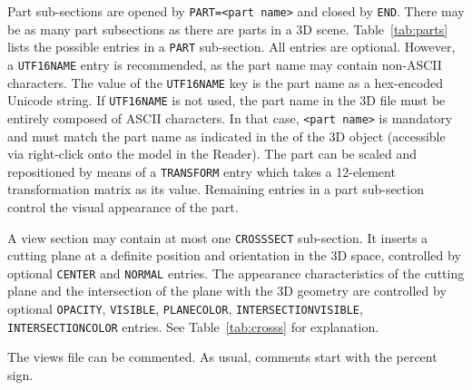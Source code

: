 \documentclass[a4paper]{article}
\begin{document}
Part sub-sections are opened by \verb+PART=<part name>+ and closed by \verb+END+. There may be as many part subsections as there are parts in a 3D scene. Table~\ref{tab:parts} lists the possible entries in a \verb+PART+ sub-section. All entries are optional. However, a \verb+UTF16NAME+ entry is recommended, as the part name may contain non-ASCII characters. The value of the \verb+UTF16NAME+ key is the part name as a hex-encoded Unicode string. If \verb+UTF16NAME+ is not used, the part name in the 3D file must be entirely composed of ASCII characters. In that case, \verb+<part name>+ is mandatory and must match the part name as indicated in the  of the 3D object (accessible via right-click onto the model in the Reader). The part can be scaled and repositioned by means of a \verb+TRANSFORM+ entry which takes a 12-element transformation matrix as its value. Remaining entries in a part sub-section control the visual appearance of the part.

A view section may contain at most one \verb+CROSSSECT+ sub-section. It inserts a cutting plane at a definite position and orientation in the 3D space, controlled by optional \verb+CENTER+ and \verb+NORMAL+ entries. The appearance characteristics of the cutting plane and the intersection of the plane with the 3D geometry are controlled by optional \verb+OPACITY+, \verb+VISIBLE+, \verb+PLANECOLOR+, \verb+INTERSECTIONVISIBLE+, \verb+INTERSECTIONCOLOR+ entries. See Table~\ref{tab:crosss} for explanation.

The views file can be commented. As usual, comments start with the percent sign.
\end{document}
